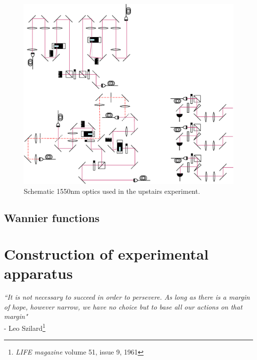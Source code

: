 	\begin{figure}[h]
	\centering
	\includegraphics[width=\textwidth]{fig/apparatus/dipole_optics}
	\caption{Schematic 1550nm optics used in the upstairs experiment.}
	\label{fig:dipole_optics}
	\end{figure}

\subsection{Wannier functions}


\section{Construction of experimental apparatus}

\begin{adjustwidth}{1cm}{0cm}
\begin{flushright}
\emph{``It is not necessary to succeed in order to persevere.
	As long as there is a margin of hope, however narrow, we have no choice but to base all our actions on that margin"}\\
- Leo Szilard\footnote{\emph{LIFE magazine} volume 51, issue 9, 1961 }\\
\end{flushright}
\end{adjustwidth}


